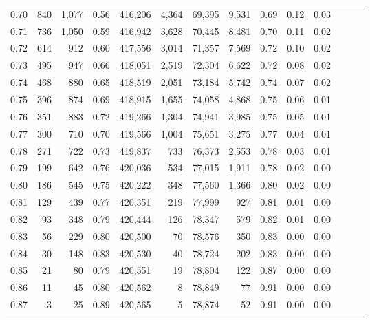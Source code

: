 \begin{tabular}{rrrrrrrrrrrrrr}
0.70 &     840 &  1,077 &  0.56 &  416,206 &    4,364 &  69,395 &   9,531 &  0.69 &  0.12 &      0.03 \\
0.71 &     736 &  1,050 &  0.59 &  416,942 &    3,628 &  70,445 &   8,481 &  0.70 &  0.11 &      0.02 \\
0.72 &     614 &    912 &  0.60 &  417,556 &    3,014 &  71,357 &   7,569 &  0.72 &  0.10 &      0.02 \\
0.73 &     495 &    947 &  0.66 &  418,051 &    2,519 &  72,304 &   6,622 &  0.72 &  0.08 &      0.02 \\
0.74 &     468 &    880 &  0.65 &  418,519 &    2,051 &  73,184 &   5,742 &  0.74 &  0.07 &      0.02 \\
0.75 &     396 &    874 &  0.69 &  418,915 &    1,655 &  74,058 &   4,868 &  0.75 &  0.06 &      0.01 \\
0.76 &     351 &    883 &  0.72 &  419,266 &    1,304 &  74,941 &   3,985 &  0.75 &  0.05 &      0.01 \\
0.77 &     300 &    710 &  0.70 &  419,566 &    1,004 &  75,651 &   3,275 &  0.77 &  0.04 &      0.01 \\
0.78 &     271 &    722 &  0.73 &  419,837 &      733 &  76,373 &   2,553 &  0.78 &  0.03 &      0.01 \\
0.79 &     199 &    642 &  0.76 &  420,036 &      534 &  77,015 &   1,911 &  0.78 &  0.02 &      0.00 \\
0.80 &     186 &    545 &  0.75 &  420,222 &      348 &  77,560 &   1,366 &  0.80 &  0.02 &      0.00 \\
0.81 &     129 &    439 &  0.77 &  420,351 &      219 &  77,999 &     927 &  0.81 &  0.01 &      0.00 \\
0.82 &      93 &    348 &  0.79 &  420,444 &      126 &  78,347 &     579 &  0.82 &  0.01 &      0.00 \\
0.83 &      56 &    229 &  0.80 &  420,500 &       70 &  78,576 &     350 &  0.83 &  0.00 &      0.00 \\
0.84 &      30 &    148 &  0.83 &  420,530 &       40 &  78,724 &     202 &  0.83 &  0.00 &      0.00 \\
0.85 &      21 &     80 &  0.79 &  420,551 &       19 &  78,804 &     122 &  0.87 &  0.00 &      0.00 \\
0.86 &      11 &     45 &  0.80 &  420,562 &        8 &  78,849 &      77 &  0.91 &  0.00 &      0.00 \\
0.87 &       3 &     25 &  0.89 &  420,565 &        5 &  78,874 &      52 &  0.91 &  0.00 &      0.00 \\

\end{tabular}
